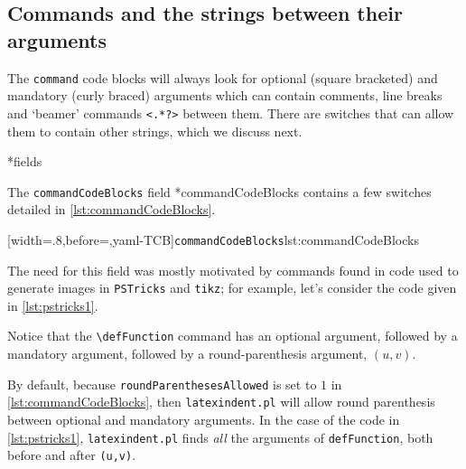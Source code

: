 \subsection{Commands and the strings between their arguments}\label{subsec:commands-string-between}
	The \texttt{command} code blocks will always look for optional (square bracketed) and
	mandatory (curly braced) arguments which can contain comments, line breaks and
	`beamer' commands \lstinline!<.*?>!  between them. There are switches that can allow them to contain
	other strings, which we discuss next.

*{fields}

	The \texttt{commandCodeBlocks} field%
	*{commandCodeBlocks} contains a few switches detailed in \cref{lst:commandCodeBlocks}.

	[width=.8\linewidth,before=\centering,yaml-TCB]{\texttt{commandCodeBlocks}}{lst:commandCodeBlocks}


	The need for this field was mostly motivated by commands found in code used to generate images in \texttt{PSTricks} and \texttt{tikz}; for example,
	let's consider the code given in \cref{lst:pstricks1}.

	\begin{minipage}{.45\textwidth}
	\end{minipage}
	\hfill
	\begin{minipage}{.45\textwidth}
	\end{minipage}

	Notice that the \lstinline!\defFunction! command has an optional argument, followed by a
	mandatory argument, followed by a round-parenthesis argument, $(u,v)$.

	By default, because \texttt{roundParenthesesAllowed} is set to $1$ in \cref{lst:commandCodeBlocks}, then \texttt{latexindent.pl}
	will allow round parenthesis between optional and mandatory arguments. In the case of the code in \cref{lst:pstricks1},
	\texttt{latexindent.pl} finds \emph{all} the arguments of \lstinline!defFunction!, both before and after \lstinline!(u,v)!.

